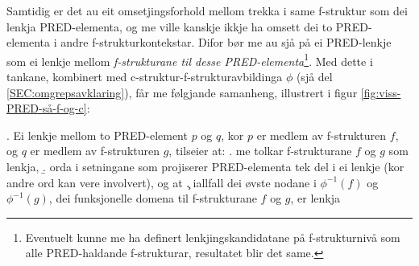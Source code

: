 \documentclass[11pt,a4paper,oneside,draft]{book}
\begin{document}
Samtidig er det au eit omsetjingsforhold mellom trekka i same
f-struktur som dei lenkja PRED-elementa, og me ville kanskje ikkje ha
omsett dei to PRED-elementa i andre f-strukturkontekstar. Difor bør me
au sjå på ei PRED-lenkje som ei lenkje mellom \emph{f-strukturane til
desse PRED-elementa}\footnote{Eventuelt kunne me ha definert lenkjingskandidatane på
       f-strukturnivå som alle PRED-haldande f-strukturar, resultatet
       blir det same. }.  Med dette i tankane, kombinert med
c-struktur-f-strukturavbildinga $\phi$ (sjå del
\ref{SEC:omgrepsavklaring}), får me følgjande samanheng, illustrert i
figur \ref{fig:viss-PRED-så-f-og-c}:

\ex. \label{f-links} Ei lenkje mellom to PRED-element $p$ og $q$, kor
      $p$ er medlem av f-strukturen $f$, og $q$ er medlem av
      f-strukturen $g$, tilseier at:
\a. \label{f-links-substr} me tolkar f-strukturane $f$ og $g$ som lenkja,
\b. \label{f-links-words} orda i setningane som projiserer
     PRED-elementa tek del i ei lenkje (kor andre
     ord kan vere involvert), og at
\c. \label{f-links-domain} iallfall dei øvste nodane i $\phi^{-1}(f)$
     og $\phi^{-1}(g)$, dei funksjonelle domena til f-strukturane $f$
     og $g$, er lenkja 
\end{document}
